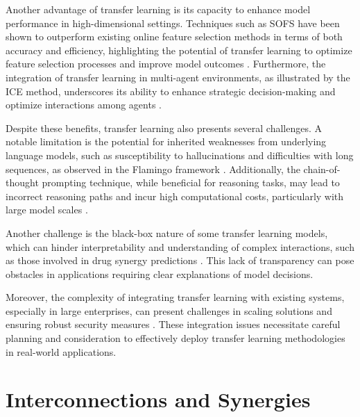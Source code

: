 Another advantage of transfer learning is its capacity to enhance model performance in high-dimensional settings. Techniques such as SOFS have been shown to outperform existing online feature selection methods in terms of both accuracy and efficiency, highlighting the potential of transfer learning to optimize feature selection processes and improve model outcomes \cite{wu2015largescaleonlinefeatureselection}. Furthermore, the integration of transfer learning in multi-agent environments, as illustrated by the ICE method, underscores its ability to enhance strategic decision-making and optimize interactions among agents \cite{waugh2011computationalrationalizationinverseequilibrium}.



Despite these benefits, transfer learning also presents several challenges. A notable limitation is the potential for inherited weaknesses from underlying language models, such as susceptibility to hallucinations and difficulties with long sequences, as observed in the Flamingo framework \cite{alayrac2022flamingo}. Additionally, the chain-of-thought prompting technique, while beneficial for reasoning tasks, may lead to incorrect reasoning paths and incur high computational costs, particularly with large model scales \cite{wei2022chain}.



Another challenge is the black-box nature of some transfer learning models, which can hinder interpretability and understanding of complex interactions, such as those involved in drug synergy predictions \cite{edwards2023synergptincontextlearningpersonalized}. This lack of transparency can pose obstacles in applications requiring clear explanations of model decisions.



Moreover, the complexity of integrating transfer learning with existing systems, especially in large enterprises, can present challenges in scaling solutions and ensuring robust security measures \cite{pandy2024advancementsroboticsprocessautomation}. These integration issues necessitate careful planning and consideration to effectively deploy transfer learning methodologies in real-world applications.















\section{Interconnections and Synergies} \label{sec:Interconnections and Synergies}

